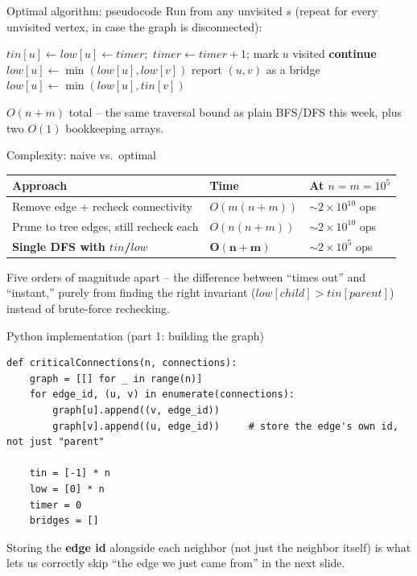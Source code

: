 \documentclass[11pt,aspectratio=169]{beamer}
\begin{document}
\begin{frame}{Optimal algorithm: pseudocode}
  \footnotesize
  Run  from any unvisited $s$ (repeat for every unvisited vertex,
  in case the graph is disconnected):
  \begin{algorithmic}[1]
      \State $tin[u] \gets low[u] \gets timer$;\ $timer \gets timer+1$; mark $u$ visited
         \textbf{continue} 
          \State {}
          \State $low[u] \gets \min(low[u], low[v])$
           report $(u,v)$ as a bridge \EndIf
        \Else
          \State $low[u] \gets \min(low[u], tin[v])$ 
        \EndIf
      \EndFor
    \EndFunction
  \end{algorithmic}
  $O(n+m)$ total -- the same traversal bound as plain BFS/DFS this week, plus two
  $O(1)$ bookkeeping arrays.
\end{frame}

\begin{frame}{Complexity: naive vs.\ optimal}
  \begin{center}
  \begin{tabular}{@{}lll@{}}
    \toprule
    Approach & Time & At $n=m=10^5$ \\
    \midrule
    Remove edge + recheck connectivity & $O(m(n+m))$ & $\sim 2\times 10^{10}$ ops \\
    Prune to tree edges, still recheck each & $O(n(n+m))$ & $\sim 2\times 10^{10}$ ops \\
    \textbf{Single DFS with $tin$/$low$} & $\boldsymbol{O(n+m)}$ & $\sim 2\times 10^5$
    ops \\
    \bottomrule
  \end{tabular}
  \end{center}
  Five orders of magnitude apart -- the difference between ``times out'' and
  ``instant,'' purely from finding the right invariant ($low[child] > tin[parent]$)
  instead of brute-force rechecking.
\end{frame}

\begin{frame}[fragile]{Python implementation (part 1: building the graph)}
  \begin{lstlisting}[style=py]
def criticalConnections(n, connections):
    graph = [[] for _ in range(n)]
    for edge_id, (u, v) in enumerate(connections):
        graph[u].append((v, edge_id))
        graph[v].append((u, edge_id))     # store the edge's own id, not just "parent"

    tin = [-1] * n
    low = [0] * n
    timer = 0
    bridges = []
  \end{lstlisting}
  Storing the \textbf{edge id} alongside each neighbor (not just the neighbor itself)
  is what lets us correctly skip ``the edge we just came from'' in the next slide.
\end{frame}
\end{document}
